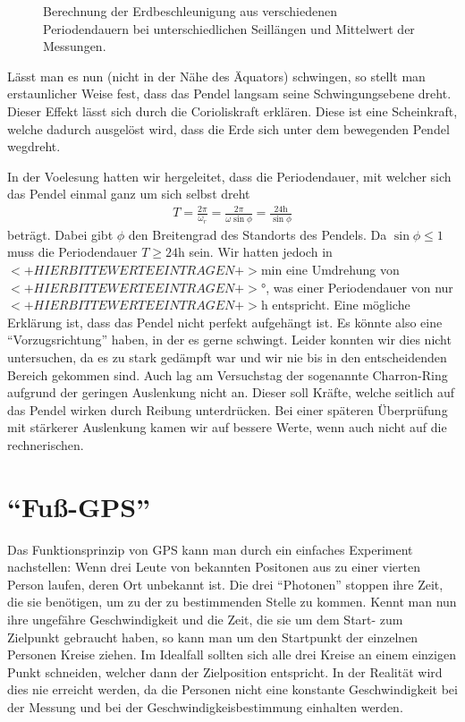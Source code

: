 \documentclass[12pt,a4paper,titlepage,headinclude,bibtotoc]{scrartcl}
\begin{document}
\begin{figure}[!htb]
	\centering
	
	\caption{Berechnung der Erdbeschleunigung aus verschiedenen Periodendauern bei unterschiedlichen Seillängen und Mittelwert der Messungen.}
	\label{fig:gbesch}
\end{figure}

Lässt man es nun (nicht in der Nähe des Äquators) schwingen, so stellt man erstaunlicher Weise fest, dass das Pendel langsam seine Schwingungsebene dreht.
Dieser Effekt lässt sich durch die Corioliskraft erklären.
Diese ist eine Scheinkraft, welche dadurch ausgelöst wird, dass die Erde sich unter dem bewegenden Pendel wegdreht.

In der Voelesung hatten wir hergeleitet, dass die Periodendauer, mit welcher sich das Pendel einmal ganz um sich selbst dreht
\begin{align}
	T=\frac{2\pi}{\omega_r}=\frac{2\pi}{\omega\sin\phi}=\frac{24\si\hour}{\sin\phi}
\end{align}
beträgt.
Dabei gibt $\phi$ den Breitengrad des Standorts des Pendels.
Da $\sin\phi\leq1$ muss die Periodendauer $T\geq24\si\hour$ sein.
Wir hatten jedoch in $<+HIER BITTE WERTE EINTRAGEN+>\si\minute$ eine Umdrehung von $<+HIER BITTE WERTE EINTRAGEN+>\si\degree$, was einer Periodendauer von nur $<+HIER BITTE WERTE EINTRAGEN+>\si\hour$ entspricht.
Eine mögliche Erklärung ist, dass das Pendel nicht perfekt aufgehängt ist.
Es könnte also eine "`Vorzugsrichtung"' haben, in der es gerne schwingt.
Leider konnten wir dies nicht untersuchen, da es zu stark gedämpft war und wir nie bis in den entscheidenden Bereich gekommen sind.
Auch lag am Versuchstag der sogenannte Charron-Ring aufgrund der geringen Auslenkung nicht an.
Dieser soll Kräfte, welche seitlich auf das Pendel wirken durch Reibung unterdrücken.
Bei einer späteren Überprüfung mit stärkerer Auslenkung kamen wir auf bessere Werte, wenn auch nicht auf die rechnerischen.




\section{"`Fuß-GPS"'}
Das Funktionsprinzip von GPS kann man durch ein einfaches Experiment nachstellen:
Wenn drei Leute von bekannten Positonen aus zu einer vierten Person laufen, deren Ort unbekannt ist.
Die drei "`Photonen"' stoppen ihre Zeit, die sie benötigen, um zu der zu bestimmenden Stelle zu kommen.
Kennt man nun ihre ungefähre Geschwindigkeit und die Zeit, die sie um dem Start- zum Zielpunkt gebraucht haben, so kann man um den Startpunkt der einzelnen Personen Kreise ziehen.
Im Idealfall sollten sich alle drei Kreise an einem einzigen Punkt schneiden, welcher dann der Zielposition entspricht.
In der Realität wird dies nie erreicht werden, da die Personen nicht eine konstante Geschwindigkeit bei der Messung und bei der Geschwindigkeisbestimmung einhalten werden.
\end{document}
